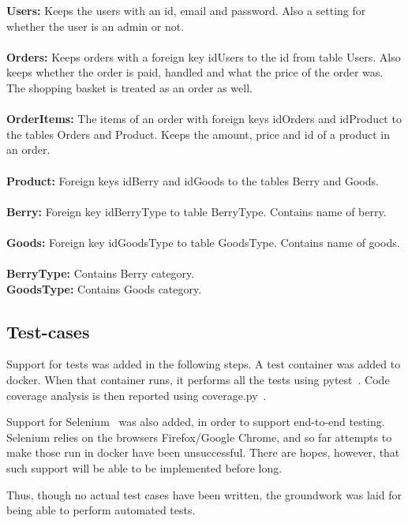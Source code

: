\textbf{Users:}
Keeps the users with an id, email and password. Also a setting for whether the user is an admin or
not. 
\\
\\
\textbf{Orders:}
Keeps orders with a foreign key idUsers to the id from table Users. Also keeps whether the order is
paid, handled and what the price of the order was. The shopping basket is treated as an order as
well.
\\
\\
\textbf{OrderItems:}
The items of an order with foreign keys idOrders and idProduct to the tables Orders and Product.
Keeps the amount, price and id of a product in an order.
\\
\\
\textbf{Product:}
Foreign keys idBerry and idGoods to the tables Berry and Goods.
\\
\\
\textbf{Berry:}
Foreign key idBerryType to table BerryType. Contains name of berry.
\\
\\
\textbf{Goods:}
Foreign key idGoodsType to table GoodsType. Contains name of goods.
\\
\\
\textbf{BerryType:}
Contains Berry category.
\\
\textbf{GoodsType:}
Contains Goods category.
\newpage
\subsection{Test-cases}

Support for tests was added in the following steps. A test container was added to docker. When that container runs, it performs all the tests using pytest~\cite{pytest}. Code coverage analysis is then reported using coverage.py~\cite{coverage}. 

Support for Selenium~\cite{selenium} was also added, in order to support end-to-end testing. Selenium relies on the browsers Firefox/Google Chrome, and so far attempts to make those run in docker have been unsuccessful. There are hopes, however, that such support will be able to be implemented before long.

Thus, though no actual test cases have been written, the groundwork was laid for being able to perform automated tests.

\newpage
